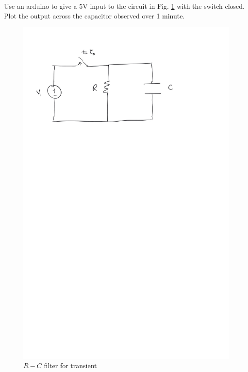 

\begin{problem}
Use an arduino to give a 5V input to the  circuit in Fig. \ref{fig:transient} with the switch closed.  Plot the output across the capacitor observed over 1 minute.  

	\begin{figure}[!h]
\centering
\includegraphics[width=\columnwidth]{chapter3/transient}
\caption{$R-C$ filter for transient}
\label{fig:transient}
\end{figure}
\end{problem}

